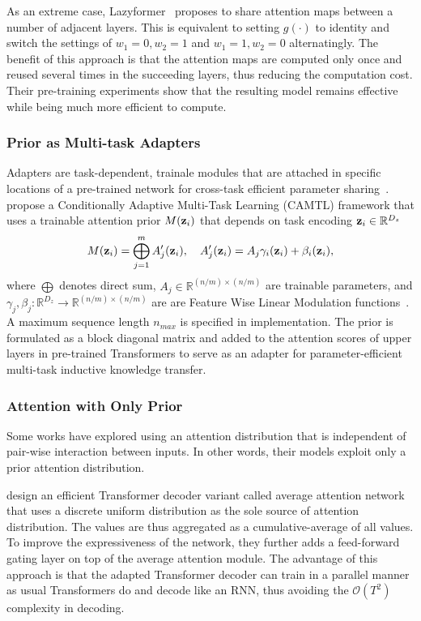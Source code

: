 \documentclass[manuscript,acmsmall,screen,nonacm]{acmart}
\theoremstyle{definition}
\begin{document}
As an extreme case, Lazyformer~\cite{ying21lazyformer} proposes to share attention maps between a number of adjacent layers. This is equivalent to setting $g(\cdot)$ to identity and switch the settings of $w_1=0,w_2=1$ and $w_1=1,w_2=0$ alternatingly. The benefit of this approach is that the attention maps are computed only once and reused several times in the succeeding layers, thus reducing the computation cost. Their pre-training experiments show that the resulting model remains effective while being much more efficient to compute.

\subsubsection{Prior as Multi-task Adapters}
Adapters are task-dependent, trainale modules that are attached in specific locations of a pre-trained network for cross-task efficient parameter sharing~\cite{rebuffi17residualadapters}. \citet{pilault2021conditionally} propose a Conditionally Adaptive Multi-Task Learning (CAMTL) framework that uses a trainable attention prior $M(\mathbf{z}_i)$ that depends on task encoding $\mathbf{z}_i\in\mathbb{R}^{D_z}$
\begin{equation}
    M(\mathbf{z}_i)=\bigoplus_{j=1}^m A'_j(\mathbf{z}_i),\quad A'_j(\mathbf{z}_i)=A_j\gamma_i(\mathbf{z}_i)+\beta_i(\mathbf{z}_i),
\end{equation}
where $\bigoplus$ denotes direct sum, $A_j\in \mathbb{R}^{(n/m)\times(n/m)}$ are trainable parameters, and $\gamma_j,\beta_j:\mathbb{R}^{D_z}\rightarrow \mathbb{R}^{(n/m)\times(n/m)}$ are are Feature Wise
Linear Modulation functions~\cite{perez18film}. A maximum sequence length $n_{max}$ is specified in implementation. The prior is formulated as a block diagonal matrix and added to the attention scores of upper layers in pre-trained Transformers to serve as an adapter for parameter-efficient multi-task inductive knowledge transfer.


\subsubsection{Attention with Only Prior}
Some works have explored using an attention distribution that is independent of pair-wise interaction between inputs. In other words, their models exploit only a prior attention distribution.

\citet{zhang-etal-2018-average} design an efficient Transformer decoder variant called average attention network that uses a discrete uniform distribution as the sole source of attention distribution. The values are thus aggregated as a cumulative-average of all values. To improve the expressiveness of the network, they further adds a feed-forward
gating layer on top of the average attention module. The advantage of this approach is that the adapted Transformer decoder can train in a parallel manner as usual Transformers do and decode like an RNN, thus avoiding the $\mathcal O(T^2)$ complexity in decoding.
\end{document}
